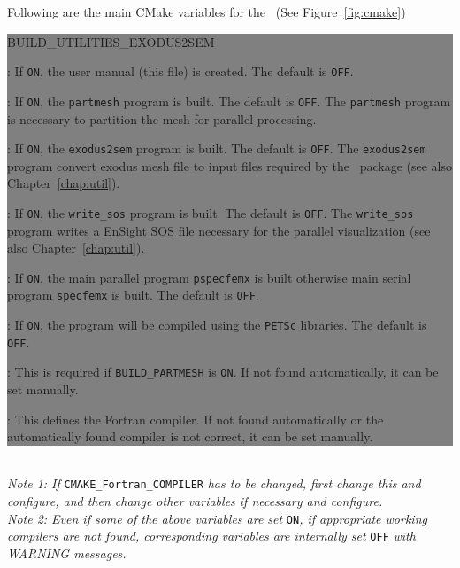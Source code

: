 Following are the main CMake variables for the \pack\ (See Figure~\ref{fig:cmake})

\colorbox{gray}{
\parbox{15.5cm}{
\begin{adescription}{BUILD\_UTILITIES\_EXODUS2SEM}
\item[BUILD\_DOCUMENTATION]           : If \texttt{ON}, the user manual (this file) is created. The default is \texttt{OFF}.
\item[BUILD\_PARTMESH]                : If \texttt{ON}, the \texttt{partmesh} program is built. The default is \texttt{OFF}. The \texttt{partmesh} program is necessary to partition the mesh for parallel processing.
\item[BUILD\_UTILITIES\_EXODUS2SEM]   : If \texttt{ON}, the \texttt{exodus2sem} program is built. The default is \texttt{OFF}. The \texttt{exodus2sem} program convert exodus mesh file to input files required by the \pack\ package (see also Chapter~\ref{chap:util}).
\item[BUILD\_UTILITIES\_WRITE\_SOS]   : If \texttt{ON}, the \texttt{write\_sos} program is built. The default is \texttt{OFF}. The \texttt{write\_sos} program writes a EnSight SOS file necessary for the parallel visualization (see also Chapter~\ref{chap:util}).
\item[ENABLE\_MPI]                    : If \texttt{ON}, the main parallel program \texttt{pspecfemx} is built otherwise main serial program \texttt{specfemx} is built. The default is \texttt{OFF}.
\item[ENABLE\_PETSC]                    : If \texttt{ON}, the program will be compiled using the \texttt{PETSc} libraries. The default is \texttt{OFF}.
\item[SCOTCH\_LIBRARY\_PATH]          : This is required if \texttt{BUILD\_PARTMESH} is \texttt{ON}. If not found automatically, it can be set manually.
\item[CMAKE\_Fortran\_COMPILER]       : This defines the Fortran compiler. If not found automatically or the automatically found compiler is not correct, it can be set manually.
\end{adescription}
}}\\

{\emph{Note 1: If}} \texttt{CMAKE\_Fortran\_COMPILER} {\emph{has to be changed, first change this and configure, and then change other variables if necessary and configure.}}\\
{\emph{Note 2: Even if some of the above variables are set }} \texttt{ON}{\emph{, if appropriate working compilers are not found, corresponding variables are internally set}} \texttt{OFF} {\emph{with WARNING messages.}}

